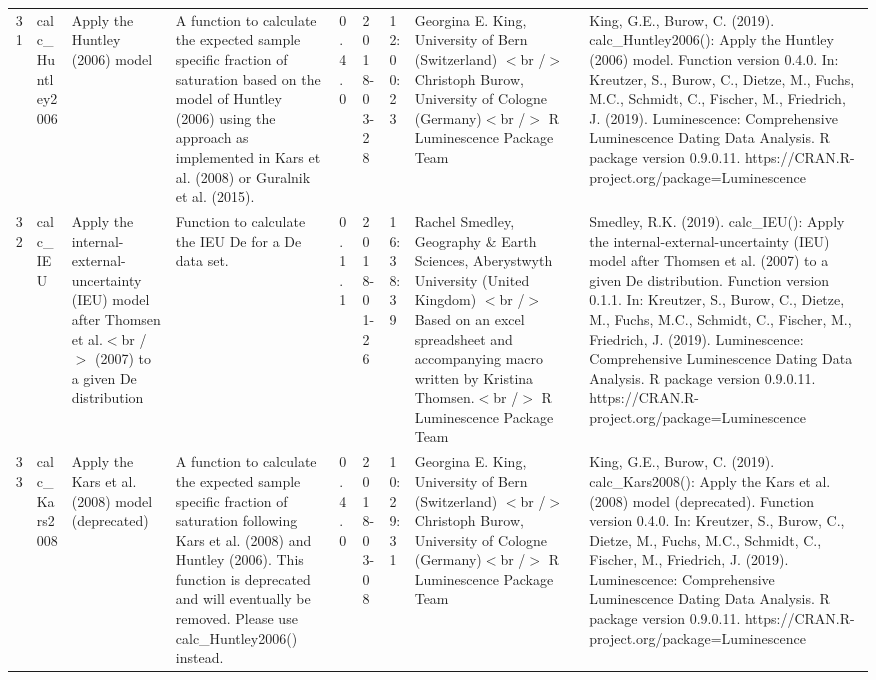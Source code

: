 \begin{table}[ht]
\begin{tabular}{rllllllll}
 \\ 
  31 & calc\_Huntley2006 & Apply the Huntley (2006) model & A function to calculate the expected sample specific fraction of saturation based on the model of Huntley (2006) using the approach as implemented in Kars et al. (2008) or Guralnik et al. (2015). & 0.4.0 & 2018-03-28 & 12:00:23
 & Georgina E. King, University of Bern (Switzerland)  $<$br /$>$ Christoph Burow, University of Cologne (Germany)$<$br /$>$  R Luminescence Package Team & King, G.E., Burow, C. (2019). calc\_Huntley2006(): Apply the Huntley (2006) model. Function version 0.4.0. In: Kreutzer, S., Burow, C., Dietze, M., Fuchs, M.C., Schmidt, C., Fischer, M., Friedrich, J. (2019). Luminescence: Comprehensive Luminescence Dating Data Analysis. R package version 0.9.0.11. https://CRAN.R-project.org/package=Luminescence
 \\ 
  32 & calc\_IEU & Apply the internal-external-uncertainty (IEU) model after Thomsen et al.$<$br /$>$ (2007) to a given De distribution & Function to calculate the IEU De for a De data set. & 0.1.1 & 2018-01-26 & 16:38:39
 & Rachel Smedley, Geography \& Earth Sciences, Aberystwyth University (United Kingdom)  $<$br /$>$ Based on an excel spreadsheet and accompanying macro written by Kristina Thomsen.$<$br /$>$  R Luminescence Package Team & Smedley, R.K. (2019). calc\_IEU(): Apply the internal-external-uncertainty (IEU) model after Thomsen et al. (2007) to a given De distribution. Function version 0.1.1. In: Kreutzer, S., Burow, C., Dietze, M., Fuchs, M.C., Schmidt, C., Fischer, M., Friedrich, J. (2019). Luminescence: Comprehensive Luminescence Dating Data Analysis. R package version 0.9.0.11. https://CRAN.R-project.org/package=Luminescence
 \\ 
  33 & calc\_Kars2008 & Apply the Kars et al. (2008) model (deprecated) & A function to calculate the expected sample specific fraction of saturation following Kars et al. (2008) and Huntley (2006). This function is deprecated and will eventually be removed. Please use  calc\_Huntley2006()  instead. & 0.4.0 & 2018-03-08 & 10:29:31
 & Georgina E. King, University of Bern (Switzerland)  $<$br /$>$ Christoph Burow, University of Cologne (Germany)$<$br /$>$  R Luminescence Package Team & King, G.E., Burow, C. (2019). calc\_Kars2008(): Apply the Kars et al. (2008) model (deprecated). Function version 0.4.0. In: Kreutzer, S., Burow, C., Dietze, M., Fuchs, M.C., Schmidt, C., Fischer, M., Friedrich, J. (2019). Luminescence: Comprehensive Luminescence Dating Data Analysis. R package version 0.9.0.11. https://CRAN.R-project.org/package=Luminescence

\end{tabular}
\end{table}

